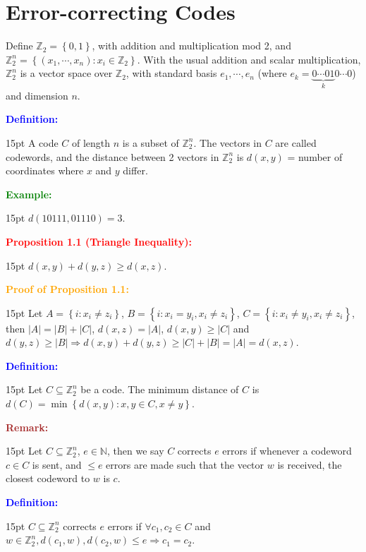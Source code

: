 \documentclass[12pt]{article}
\newcommand{\noparskip}{\vspace{-\parskip}}
\newenvironment{dent}
	{\begin{adjustwidth}{15pt}{}\noparskip}
	{\end{adjustwidth}}
\newenvironment{result}[1]
	{\textcolor{Red}{\textbf{#1:}}\begin{dent}}
	{\end{dent}}
\newenvironment{proof}[1]
	{\textcolor{Orange}{\textbf{Proof of #1:}}\begin{dent}}
	{\end{dent}}
\newenvironment{definition}
	{\textcolor{Blue}{\textbf{Definition:}}\begin{dent}}
	{\end{dent}}
\newenvironment{example}
	{\textcolor{Green}{\textbf{Example:}}\begin{dent}}
	{\end{dent}}
\newenvironment{remark}
	{\textcolor{Brown}{\textbf{Remark:}}\begin{dent}}
	{\end{dent}}
\renewcommand{\implies}{\Rightarrow}
\newcommand{\set}[1]{\left\{ #1 \right\}}
\newcommand{\sizeof}[1]{\left| #1 \right|}
\newcommand{\Z}{\mathbb{Z}}
\newcommand{\N}{\mathbb{N}}
\begin{document}
\pagebreak

\section{Error-correcting Codes}

Define $\Z_2 = \set{0, 1}$, with addition and multiplication mod 2, and $\Z_2^n = \set{(x_1, \cdots, x_n): x_i \in \Z_2}$. With the usual addition and scalar multiplication, $\Z_2^n$ is a vector space over $\Z_2$, with standard basis $e_1, \cdots, e_n$ (where $e_k = \underbrace{0 \cdots 01}_k 0 \cdots 0$) and dimension $n$.

\begin{definition}
A code $C$ of length $n$ is a subset of $\Z_2^n$. The vectors in $C$ are called codewords, and the distance between 2 vectors in $\Z_2^n$ is $d(x, y)$ = number of coordinates where $x$ and $y$ differ.
\end{definition}

\begin{example}
$d(10111, 01110) = 3$.
\end{example}

\begin{result}{Proposition 1.1 (Triangle Inequality)}
$d(x, y) + d(y, z) \ge d(x, z)$.
\end{result}

\begin{proof}{Proposition 1.1}
Let $A = \set{i: x_i \ne z_i}$, $B = \set{i: x_i = y_i, x_i \ne z_i}$, $C = \set{i: x_i \ne y_i, x_i \ne z_i}$, then $\sizeof{A} = \sizeof{B} + \sizeof{C}$, $d(x, z) = \sizeof{A}$, $d(x, y) \ge \sizeof{C}$ and $d(y, z) \ge \sizeof{B} \implies d(x, y) + d(y, z) \ge \sizeof{C} + \sizeof{B} = \sizeof{A} = d(x, z)$.
\end{proof}

\begin{definition}
Let $C \subseteq \Z_2^n$ be a code. The minimum distance of $C$ is $d(C) = \min \set{d(x, y): x, y \in C, x \ne y}$.
\end{definition}

\begin{remark}
Let $C \subseteq \Z_2^n$, $e \in \N$, then we say $C$ corrects $e$ errors if whenever a codeword $c \in C$ is sent, and $\le e$ errors are made such that the vector $w$ is received, the closest codeword to $w$ is $c$.
\end{remark}

\begin{definition}
$C \subseteq \Z_2^n$ corrects $e$ errors if $\forall c_1, c_2 \in C$ and $w \in \Z_2^n, d(c_1, w), d(c_2, w) \le e \implies c_1 = c_2$.
\end{definition}
\end{document}
